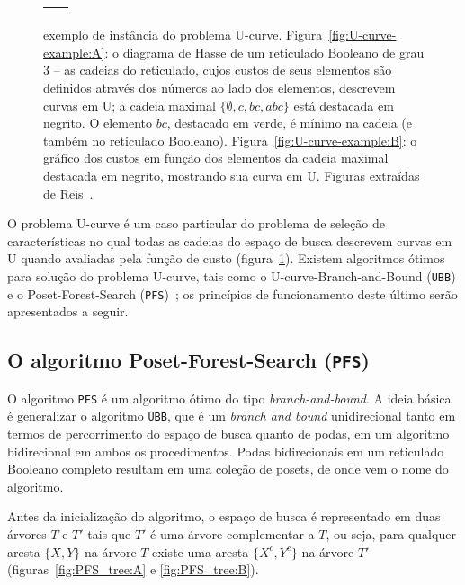 \documentclass[12pt]{article}
\begin{document}
\begin{figure}[h]
\begin{tabular}{c c}
{        \label{fig:U-curve-example:B} 
    }
\end{tabular}
\caption{exemplo de instância do problema U-curve. 
Figura~\ref{fig:U-curve-example:A}: o diagrama de Hasse de um reticulado
Booleano de grau $3$ -- as cadeias do reticulado, cujos custos de seus
elementos são definidos através dos números ao lado dos elementos, descrevem
curvas em U; a cadeia maximal $\{ \emptyset, c, bc, abc \}$ está
destacada em negrito. O elemento $bc$, destacado em verde, é mínimo na
cadeia (e também no reticulado Booleano). 
Figura~\ref{fig:U-curve-example:B}: o gráfico dos custos em função dos
elementos da cadeia maximal destacada em negrito, mostrando sua curva em
U. Figuras extraídas de Reis~\cite{msreis thesis}.} 
    \label{fig:U-curve} 
\end{figure}



O problema U-curve é um caso particular do problema de seleção de
características no qual todas as cadeias do espaço de busca descrevem
curvas em U quando avaliadas pela função de custo (figura~\ref{fig:U-curve}).
Existem algoritmos
ótimos para solução do problema U-curve, tais como o U-curve-Branch-and-Bound
({\tt UBB}) e o Poset-Forest-Search ({\tt PFS})~\cite{msreis thesis}; os
princípios de funcionamento deste último serão apresentados a seguir.


\subsection{O algoritmo Poset-Forest-Search ({\tt PFS})}
O algoritmo {\tt PFS} é um algoritmo ótimo do tipo 
{\em branch-and-bound}. A ideia básica é generalizar o algoritmo {\tt UBB},
que é um {\em branch and bound} unidirecional tanto em termos de percorrimento do espaço de busca quanto de podas, em um algoritmo bidirecional em ambos os procedimentos. Podas bidirecionais em um reticulado Booleano completo resultam em uma coleção de posets, de onde vem o nome do algoritmo.

Antes da inicialização do algoritmo, o espaço de 
busca é representado em duas árvores $T$ e $T'$ tais que $T'$ é uma árvore complementar a 
$T$, ou seja, para qualquer aresta $\{ X, Y \}$ na
árvore $T$ existe uma aresta $\{ X^c, Y^c \}$ na árvore $T'$ 
(figuras~\ref{fig:PFS_tree:A} e \ref{fig:PFS_tree:B}).
\end{document}
